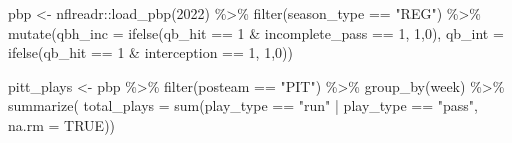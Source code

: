 \documentclass[
  letterpaper,
]{krantz}
\newenvironment{Shaded}{\begin{snugshade}}{\end{snugshade}}
\newcommand{\AttributeTok}[1]{\textcolor[rgb]{0.40,0.45,0.13}{#1}}
\newcommand{\ConstantTok}[1]{\textcolor[rgb]{0.56,0.35,0.01}{#1}}
\newcommand{\DecValTok}[1]{\textcolor[rgb]{0.68,0.00,0.00}{#1}}
\newcommand{\FunctionTok}[1]{\textcolor[rgb]{0.28,0.35,0.67}{#1}}
\newcommand{\NormalTok}[1]{\textcolor[rgb]{0.00,0.23,0.31}{#1}}
\newcommand{\OtherTok}[1]{\textcolor[rgb]{0.00,0.23,0.31}{#1}}
\newcommand{\SpecialCharTok}[1]{\textcolor[rgb]{0.37,0.37,0.37}{#1}}
\newcommand{\StringTok}[1]{\textcolor[rgb]{0.13,0.47,0.30}{#1}}
\begin{document}
\begin{Shaded}
\begin{Highlighting}[]
\NormalTok{pbp }\OtherTok{\textless{}{-}}\NormalTok{ nflreadr}\SpecialCharTok{::}\FunctionTok{load\_pbp}\NormalTok{(}\DecValTok{2022}\NormalTok{) }\SpecialCharTok{\%\textgreater{}\%}
  \FunctionTok{filter}\NormalTok{(season\_type }\SpecialCharTok{==} \StringTok{"REG"}\NormalTok{) }\SpecialCharTok{\%\textgreater{}\%}
  \FunctionTok{mutate}\NormalTok{(}\AttributeTok{qbh\_inc =} \FunctionTok{ifelse}\NormalTok{(qb\_hit }\SpecialCharTok{==} \DecValTok{1} \SpecialCharTok{\&}\NormalTok{ incomplete\_pass }\SpecialCharTok{==} \DecValTok{1}\NormalTok{, }\DecValTok{1}\NormalTok{,}\DecValTok{0}\NormalTok{),}
         \AttributeTok{qb\_int =} \FunctionTok{ifelse}\NormalTok{(qb\_hit }\SpecialCharTok{==} \DecValTok{1} \SpecialCharTok{\&}\NormalTok{ interception }\SpecialCharTok{==} \DecValTok{1}\NormalTok{, }\DecValTok{1}\NormalTok{,}\DecValTok{0}\NormalTok{))}

\NormalTok{pitt\_plays }\OtherTok{\textless{}{-}}\NormalTok{ pbp }\SpecialCharTok{\%\textgreater{}\%}
  \FunctionTok{filter}\NormalTok{(posteam }\SpecialCharTok{==} \StringTok{"PIT"}\NormalTok{) }\SpecialCharTok{\%\textgreater{}\%}
  \FunctionTok{group\_by}\NormalTok{(week) }\SpecialCharTok{\%\textgreater{}\%}
  \FunctionTok{summarize}\NormalTok{(}
    \AttributeTok{total\_plays =} \FunctionTok{sum}\NormalTok{(play\_type }\SpecialCharTok{==} \StringTok{"run"} \SpecialCharTok{|}
\NormalTok{                        play\_type }\SpecialCharTok{==} \StringTok{"pass"}\NormalTok{, }\AttributeTok{na.rm =} \ConstantTok{TRUE}\NormalTok{))}


\end{Highlighting}
\end{Shaded}
\end{document}
